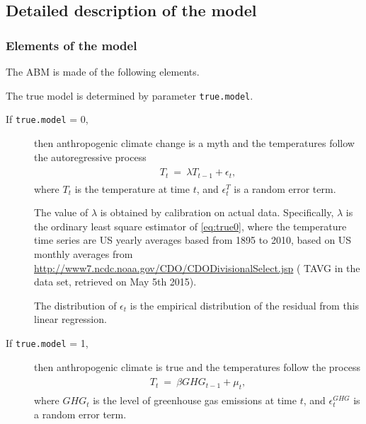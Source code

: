 \documentclass[10pt,a4paper]{article}
\title{}
\author{Martin Van der Linden}
\begin{document}
\maketitle


   \subsection{Detailed description of the model}
 	
 	\label{model}
 	
 	\subsubsection{Elements of the model}
 	
 	The ABM is made of the following elements.
 	
 	\begin{description}
 		\setlength\itemsep{0em}
 		\item [A simple ``true" model of world temperatures.] 
 		The true model is determined by parameter  \texttt{true.model}. 
 		
 		\begin{description}
 			\item[If \texttt{true.model} = 0,] then anthropogenic climate change is a myth and the temperatures follow the autoregressive process 
 			\begin{align}
 			\label{eq:true0}
 			\begin{split}
 			T_t ~ =~  \lambda T_{t-1} +  \epsilon_t, 
 			\end{split}
 			\end{align}
 			where $T_t$ is the temperature at time $t$, and $\epsilon^T_t$ is a random error term. 
 			
 			The value of $\lambda$ is obtained by calibration on actual data. Specifically, $\lambda$ is the ordinary least square estimator of \eqref{eq:true0}, where the temperature time series are US yearly averages based from 1895 to 2010, based on US monthly averages from \url{http://www7.ncdc.noaa.gov/CDO/CDODivisionalSelect.jsp} ( TAVG in the data set, retrieved on May 5th 2015). 
 			
 			The distribution of $\epsilon_t$ is the empirical distribution of the residual from this linear regression.
 			
 			\item[If \texttt{true.model} = 1,] then anthropogenic climate is true and the temperatures follow the process 
 			\begin{align}
 			\label{eq:true1}
 			\begin{split}
 			T_t ~ =~  \beta GHG_{t-1} +  \mu_t, 
 			\end{split}
 			\end{align}
 			where $GHG_t$ is the level of greenhouse gas emissions at time $t$, and $\epsilon^{GHG}_t$ is a random error term.
 			

\end{description}
\end{description}
\end{document}
